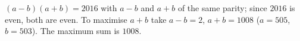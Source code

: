 $(a-b)(a+b)=2016$ with $a-b$ and $a+b$ of the same parity; since $2016$ is even, both are even. To maximise $a+b$ take $a-b=2$, $a+b=1008$ ($a=505$, $b=503$). The maximum sum is $\boxed{1008}$.
